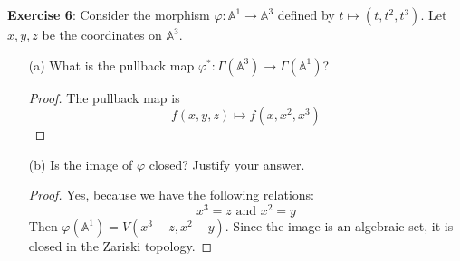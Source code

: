 \documentclass{article}
\begin{document}
\textbf{Exercise 6}: Consider the morphism $\varphi : \mathbb{A}^{1} \rightarrow\mathbb{A}^{3}$ defined by $t \mapsto (t, t^{2}, t^{3})$. Let $x, y, z$ be the coordinates on $\mathbb{A}^{3}$.
    \begin{itemize}
        \item [(a)] What is the pullback map $\varphi^{*} : \Gamma(\mathbb{A}^{3}) \rightarrow \Gamma(\mathbb{A}^{1})$?
            \begin{proof}
                The pullback map is 
                    \begin{equation*}
                        f(x, y, z) \mapsto f(x, x^{2}, x^{3})
                    \end{equation*}
            \end{proof}

        \item [(b)] Is the image of $\varphi$ closed? Justify your answer.
            \begin{proof}
                Yes, because we have the following relations:
                    \begin{equation*}
                        x^{3} = z \text{ and } x^{2} = y
                    \end{equation*}
                Then $\varphi(\mathbb{A}^{1}) = V(x^{3} - z, x^{2} - y)$. Since the image is an algebraic set, it is closed in the Zariski topology.
            \end{proof}


\end{itemize}
\end{document}
